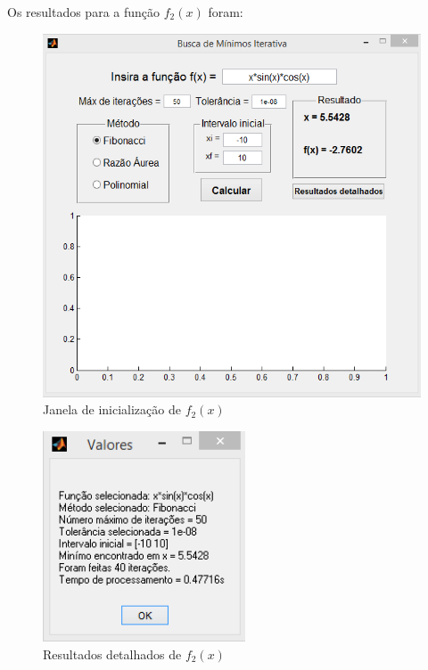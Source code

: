 Os resultados para a função $ f_2(x) $ foram:

\begin{figure}[h]
	\begin{center}
		\includegraphics[width=13cm]{../fibonacci/f2_gui.png}   
		\caption{Janela de inicialização de $ f_2(x) $}
		\label{fig:fibonacci-f2-gui}
	\end{center}
\end{figure}

\begin{figure}[h!]
	\begin{center}
		\includegraphics[width=6cm]{../fibonacci/f2_resultados.png}   
		\caption{Resultados detalhados de $ f_2(x) $}
		\label{fig:fibonacci-f2-resultados}
	\end{center}
\end{figure}

